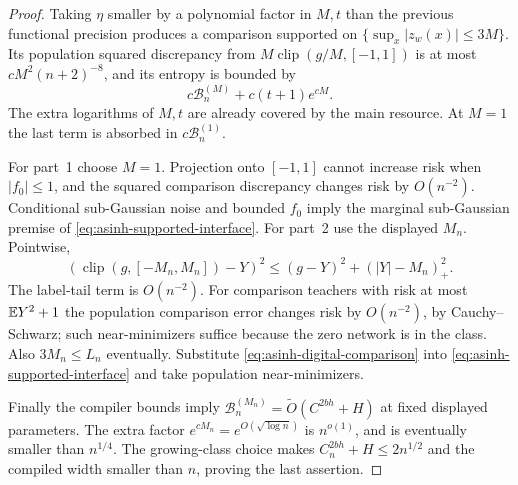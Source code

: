 \begin{proof}
Taking $\eta$ smaller by a polynomial factor in $M,t$ than the previous
functional precision produces a comparison supported on
$\{\sup_x|z_w(x)|\le3M\}$.  Its population squared discrepancy from
$M\operatorname{clip}(g/M,[-1,1])$ is at most
$cM^2(n+2)^{-8}$, and its entropy is bounded by
\begin{equation}\label{eq:asinh-digital-comparison}
 c\mathcal B_n^{(M)}+c(t+1)e^{cM}.
\end{equation}
The extra logarithms of $M,t$ are already covered by the main resource.
At $M=1$ the last term is absorbed in $c\mathcal B_n^{(1)}$.

For part~1 choose $M=1$.  Projection onto $[-1,1]$ cannot increase
risk when $|f_0|\le1$, and the squared comparison discrepancy changes
risk by $O(n^{-2})$.  Conditional sub-Gaussian noise and bounded $f_0$
imply the marginal sub-Gaussian premise of
\eqref{eq:asinh-supported-interface}.  For part~2 use the displayed
$M_n$.  Pointwise,
\[
 (\operatorname{clip}(g,[-M_n,M_n])-Y)^2
       \le(g-Y)^2+(|Y|-M_n)_+^2.
\]
The label-tail term is $O(n^{-2})$.  For comparison teachers with risk
at most $\mathbb E Y^2+1$ the population comparison error changes risk by
$O(n^{-2})$, by Cauchy--Schwarz; such near-minimizers suffice because
the zero network is in the class.  Also $3M_n\le L_n$ eventually.
Substitute \eqref{eq:asinh-digital-comparison} into
\eqref{eq:asinh-supported-interface} and take population near-minimizers.

Finally the compiler bounds imply
$\mathcal B_n^{(M_n)}=\widetilde O(C^{2bh}+H)$ at fixed displayed
parameters.  The extra factor $e^{cM_n}=e^{O(\sqrt{\log n})}$ is
$n^{o(1)}$, and is eventually smaller than $n^{1/4}$.
The growing-class choice makes $C_n^{2bh}+H\le2n^{1/2}$ and the
compiled width smaller than $n$, proving the last assertion.
\end{proof}
